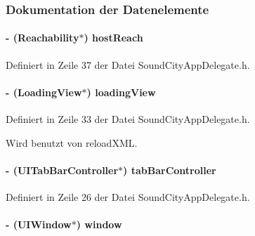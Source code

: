 \subsubsection{Dokumentation der Datenelemente}
\hypertarget{interface_sound_city_app_delegate_ab7e88e1a16d0c057c86cef12fc6fcb93}{
\paragraph[{hostReach}]{\setlength{\rightskip}{0pt plus 5cm}-\/ (Reachability$\ast$) {\bf hostReach}}\hfill}
\label{interface_sound_city_app_delegate_ab7e88e1a16d0c057c86cef12fc6fcb93}


Definiert in Zeile 37 der Datei SoundCityAppDelegate.h.\hypertarget{interface_sound_city_app_delegate_ae8ac0a409e5e027419977730dfb7fa76}{
\paragraph[{loadingView}]{\setlength{\rightskip}{0pt plus 5cm}-\/ ({\bf LoadingView}$\ast$) {\bf loadingView}}\hfill}
\label{interface_sound_city_app_delegate_ae8ac0a409e5e027419977730dfb7fa76}


Definiert in Zeile 33 der Datei SoundCityAppDelegate.h.

Wird benutzt von reloadXML.\hypertarget{interface_sound_city_app_delegate_aae84b25a8186a168c98ad9584e31e332}{
\paragraph[{tabBarController}]{\setlength{\rightskip}{0pt plus 5cm}-\/ (UITabBarController$\ast$) {\bf tabBarController}}\hfill}
\label{interface_sound_city_app_delegate_aae84b25a8186a168c98ad9584e31e332}


Definiert in Zeile 26 der Datei SoundCityAppDelegate.h.\hypertarget{interface_sound_city_app_delegate_a69c920faf02b68581fdc0543ff0e56a1}{
\paragraph[{window}]{\setlength{\rightskip}{0pt plus 5cm}-\/ (UIWindow$\ast$) {\bf window}}\hfill}
\label{interface_sound_city_app_delegate_a69c920faf02b68581fdc0543ff0e56a1}


